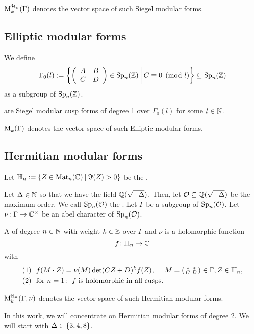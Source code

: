$\operatorname{M}^{\mathcal{H}_{n}}_k (\Gamma)$ denotes the vector space of such Siegel modular forms.

\subsection{Elliptic modular forms}

We define
\[ \Gamma_0(l) := \Set{\SimpleMatrix{A}{B}{C}{D} \in \Sp_n(\Z)}{C \equiv 0 \pmod{l}} \subseteq \Sp_n(\Z) \]
as a subgroup of $\operatorname{Sp}_n(\mathbb{Z})$.

 are Siegel modular cusp forms of degree 1 over $\Gamma_0(l)$ for some $l \in \mathbb{N}$.

$\operatorname{M}^{}_k (\Gamma)$ denotes the vector space of such Elliptic modular forms.

\subsection{Hermitian modular forms}

Let $\HalfPlane_n :=  \Set{ Z \in \M_n(\C) }{ \Im(Z) > 0}$ be the .


Let $\Delta \in \mathbb{N}$ so that we have the field $\mathbb{Q}(\sqrt{-\Delta})$.
Then, let $\mathcal{O} \subseteq \mathbb{Q}(\sqrt{-\Delta})$ be the maximum order.
We call $\operatorname{Sp}_n(\mathcal{O})$ the .
Let $\Gamma$ be a subgroup of $\operatorname{Sp}_n(\mathcal{O})$.
Let $\nu \colon \Gamma \rightarrow \mathbb{C}^\times$ be an abel character of $\operatorname{Sp}_n(\mathcal{O})$.

A 
of degree $n\in\mathbb{N}$
with weight $k\in \mathbb{Z}$
over $\Gamma$ and $\nu$
is a holomorphic function
\[ f \colon \mathbb{H}_n \rightarrow \mathbb{C} \]
with
\begin{align*}
(1) \ \ & f(M \cdot Z) = \nu(M) \det(CZ + D)^k f(Z), \ \ \ \ M = \left( \begin{smallmatrix} * & * \\ C & D \end{smallmatrix} \right) \in \Gamma, Z \in \mathbb{H}_n , \\
(2) \ \ & \text{for } n = 1 \colon \ \text{$f$ is holomorphic in all cusps} .
\end{align*}

$\operatorname{M}^{\mathbb{H}_{n}}_k (\Gamma,\nu)$
denotes the vector space of such Hermitian modular forms.

In this work, we will concentrate on Hermitian modular forms of degree 2. We will start with $\Delta \in \Set{3,4,8}$.

